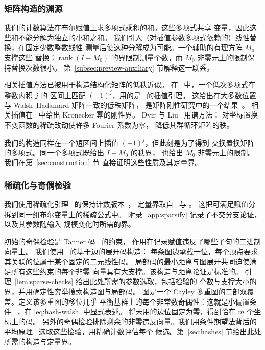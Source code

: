 \subsubsection{矩阵构造的渊源}\label{subsec:related-spectral}
我们的计数算法在布尔赋值上求多项式乘积的和。这些多项式共享
变量，因此这些和不能分解为独立的小和之和。
我们引入（对插值参数多项式依赖的）线性替换，在固定少数整数线性
测量后使这种分解成为可能。一个辅助的有理方阵 $M_0$ 支撑这些
替换：$\operatorname{rank}(I-M_0)$ 的界限制测量个数，而 $M_0$
非零元上的限制保持替换次数很小。
第~\ref{subsec:preview-auxiliary} 节解释这一联系。

相关插值方法已被用于构造结构化矩阵的低秩近似。
在~\cite[Section~3]{AW17} 中，一个低次多项式在整数内积 $j$ 的
区间上匹配 $(-1)^j$，用的是~\cite[Lemma~3.1]{AW15} 的插值引理。
这给出在大多数位置与 Walsh--Hadamard 矩阵一致的低秩矩阵，
是矩阵刚性研究中的一个结果~\cite{Val77}。
相关插值在~\cite[Theorem~6.1]{AGP23} 中给出 Kronecker 幂的刚性界。
Dvir 与 Liu~\cite[Claim~2.20 and Lemmas~3.3--3.4]{DL20} 用谱方法：
对坐标置换不变函数的稀疏改动使许多 Fourier 系数为零，
降低其群循环矩阵的秩。

我们的构造同样在一个短区间上插值 $(-1)^j$，但此刻是为了得到
交换置换矩阵的多项式。同一个多项式既给出 $I-M_0$ 的秩界，
也给出 $M_0$ 非零元上的限制。我们在第~\ref{sec:construction} 节
直接证明这些性质及其定量界。

\subsubsection{稀疏化与奇偶检验}\label{subsec:related-reductions}
我们使用稀疏化引理~\cite{IPZ} 的保持计数版本~\cite[Appendix~A]{DHMTW}，
定量界取自~\cite[Section~6]{CIP} 与
\cite[Lemma~5.14 and equation~(5.4)]{CalabroThesis}。
这把可满足赋值分拆到同一组布尔变量上的稀疏公式中。
附录~\ref{app:sparsify} 记录了不交分支论证，以及其参数随输入
规模变化时所需的界。

初始的奇偶检验是 Tanner 码~\cite[Section~II]{Tanner81} 的约束，
作用在记录赋值违反了哪些子句的二进制向量上。
我们使用~\cite[Sections~IV and~VI]{SS96} 的基于边的展开码构造：
每条图边承载一位，每个顶点要求其关联的位属于某个固定的二元线性码。
局部码的最小距离与图展开共同迫使满足所有这些约束的每个非零
向量具有大支撑。该构造与距离论证是标准的。
引理~\ref{lem:sparse-checks} 给出此处所需的参数选取，包括检验的
个数与支撑大小的界，并用确定性穷举搜索构造图与局部码。
图是一个 Cayley 多重图的二部双覆盖。定义该多重图的移位几乎
平衡基群上的每个非常数奇偶性：这就是小偏置条件
~\cite{NN93,AR94}，在 \eqref{eq:hash-walsh} 中显式表述。
将未用的边位固定为零，得到恰在 $m$ 个坐标上的码。
另外的奇偶检验排除剩余的非零违反向量。我们用条件期望法背后的
平均原理~\cite{Raghavan88} 选取这些检验，用精确计数评估每个
候选。第~\ref{sec:hashes} 节给出此处所需的构造与定量界。


